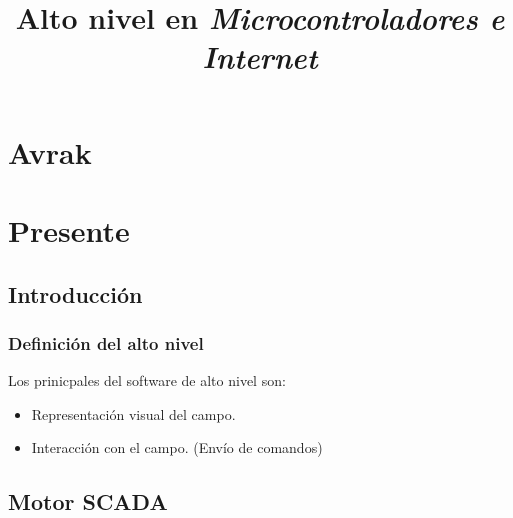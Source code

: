\documentclass{beamer}
\title{Alto nivel en \emph{Microcontroladores e Internet}}
\begin{document}
\frame{\titlepage}
\section[General]{Avrak}
\frame{\tableofcontents}

\section{Presente}
\subsection{Introducción}
\frame
{
  \frametitle{Definición del alto nivel}
  Los prinicpales del software de alto nivel son:
  \begin{itemize}
  \begin{item}<1-> Recolección de datos de las RTUs
    \begin{itemize}
      \item<1-> Tiempo real
      \item<2-> Histórico (almacenamiento)
    \end{itemize}
  \end{item}
  \item<3-> Representación visual del campo.
  \item<4-> Interacción con el campo.
    (Envío de comandos)
  \end{itemize}
}

\subsection{Motor SCADA}
\end{document}
